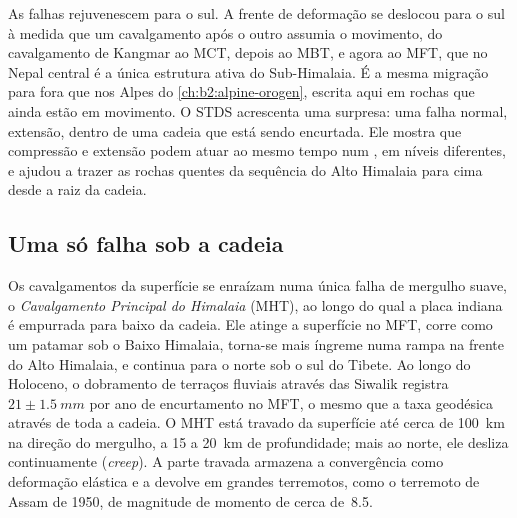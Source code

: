 As falhas rejuvenescem para o sul. A frente de deformação se deslocou para o sul à medida que um cavalgamento após o outro
assumia o movimento, do cavalgamento de Kangmar ao MCT, depois ao MBT, e agora ao MFT, que no
Nepal central é a única estrutura ativa do Sub-Himalaia. É a mesma migração para fora
que nos Alpes do \cref{ch:b2:alpine-orogen}, escrita aqui em rochas que ainda estão
em movimento. O STDS acrescenta uma surpresa: uma falha normal, extensão, dentro de uma cadeia que está sendo
encurtada. Ele mostra que compressão e extensão podem atuar ao mesmo tempo num ,
em níveis diferentes, e ajudou a trazer as rochas quentes da sequência do Alto Himalaia para cima
desde a raiz da cadeia.

\subsection{Uma só falha sob a cadeia}

Os cavalgamentos da superfície se enraízam numa única falha de mergulho suave, o \emph{Cavalgamento
Principal do Himalaia} (MHT), ao longo do qual a placa indiana é empurrada para baixo da cadeia. Ele atinge
a superfície no MFT, corre como um patamar sob o Baixo Himalaia, torna-se mais íngreme numa rampa na
frente do Alto Himalaia, e continua para o norte sob o sul do Tibete. Ao longo do Holoceno,
o dobramento de terraços fluviais através das Siwalik registra $21 \pm \qty{1.5}{mm}$ por ano de
encurtamento no MFT, o mesmo que a taxa geodésica através de toda a cadeia. O MHT está
travado da superfície até cerca de \qty{100}{km} na direção do mergulho, a 15 a \qty{20}{km} de profundidade; mais ao
norte, ele desliza continuamente (\textit{creep}). A parte travada armazena a convergência como deformação elástica e a devolve
em grandes terremotos, como o terremoto de Assam de 1950, de magnitude de momento de cerca de~8.5.

